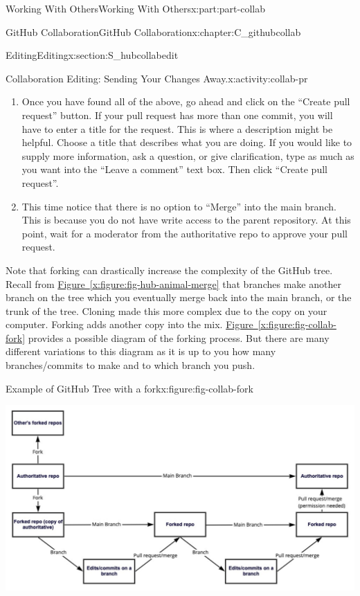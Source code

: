 \documentclass[oneside,10pt,]{book}
\newcommand{\xreffont}{\relax}
\begin{document}
\begin{partptx}{Working With Others}{}{Working With Others}{}{}{x:part:part-collab}
\begin{chapterptx}{GitHub Collaboration}{}{GitHub Collaboration}{}{}{x:chapter:C_githubcollab}
\begin{sectionptx}{Editing}{}{Editing}{}{}{x:section:S_hubcollabedit}
\begin{activity}{Collaboration Editing: Sending Your Changes Away.}{x:activity:collab-pr}
\begin{enumerate}[font=\bfseries,label=(\alph*),ref=\alph*]
\begin{enumerate}
\item{}There is a summary of all the commits made on the branch (with their commit messages)%
\item{}There is info on all of your specific changes in each file%
\end{enumerate}
%
\item{}Once you have found all of the above, go ahead and click on the ``Create pull request'' button. If your pull request has more than one commit, you will have to enter a title for the request. This is where a description might be helpful. Choose a title that describes what you are doing. If you would like to supply more information, ask a question, or give clarification, type as much as you want into the ``Leave a comment'' text box. Then click ``Create pull request''.%
\item{}This time notice that there is no option to ``Merge'' into the main branch. This is because you do not have write access to the parent repository. At this point, wait for a moderator from the authoritative repo to approve your pull request.%
\end{enumerate}
\end{activity}%
Note that forking can drastically increase the complexity of the GitHub tree. Recall from \hyperref[x:figure:fig-hub-animal-merge]{Figure~{\xreffont\ref{x:figure:fig-hub-animal-merge}}} that branches make another branch on the tree which you eventually merge back into the main branch, or the trunk of the tree. Cloning made this more complex due to the copy on your computer. Forking adds another copy into the mix. \hyperref[x:figure:fig-collab-fork]{Figure~{\xreffont\ref{x:figure:fig-collab-fork}}} provides a possible diagram of the forking process. But there are many different variations to this diagram as it is up to you how many branches\slash{}commits to make and to which branch you push.%
\begin{figureptx}{Example of GitHub Tree with a fork}{x:figure:fig-collab-fork}{}%
\begin{image}{0.025}{0.95}{0.025}%
\includegraphics[width=\linewidth]{external/collab_fork.pdf}

\end{image}
\end{figureptx}
\end{sectionptx}
\end{chapterptx}
\end{partptx}
\end{document}
